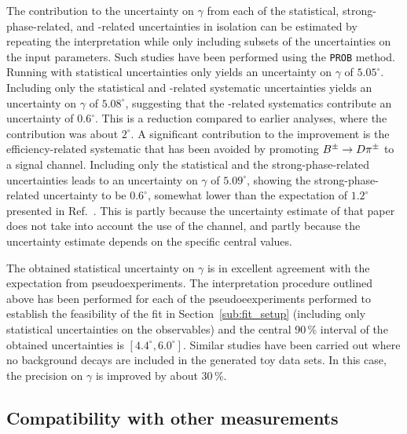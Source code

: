 The contribution to the uncertainty on $\gamma$ from each of the statistical, strong-phase-related, and \lhcb-related uncertainties in isolation can be estimated by repeating the interpretation while only including subsets of the uncertainties on the input parameters. Such studies have been performed using the \texttt{PROB} method. Running with statistical uncertainties only yields an uncertainty on $\gamma$ of $5.05^\circ$. Including only the statistical and \lhcb-related systematic uncertainties yields an uncertainty on $\gamma$ of $5.08^\circ$, suggesting that the \lhcb-related systematics  contribute an uncertainty of $0.6^\circ$. This is a reduction compared to earlier analyses, where the contribution was about $2^\circ$. A significant contribution to the improvement is the efficiency-related systematic that has been avoided by promoting ${{{B}^\pm}\rightarrow{\ensuremath{D}}{\ensuremath{{\pi}^\pm}}}$ to a signal channel. Including only the statistical and the strong-phase-related uncertainties leads to an uncertainty on $\gamma$ of $5.09^\circ$, showing the strong-phase-related uncertainty to be $0.6^\circ$, somewhat lower than the expectation of $1.2^\circ$  presented in Ref.~\cite{BESIII}. This is partly because the uncertainty estimate of that paper does not take into account the use of the \DtoKsKK channel, and partly because the uncertainty estimate depends on the specific central values.

The obtained statistical uncertainty on $\gamma$ is in excellent agreement with the expectation from pseudoexperiments. The interpretation procedure outlined above has been performed for each of the pseudoeexperiments performed to establish the feasibility of the \CP fit in Section~\ref{sub:fit_setup} (including only statistical uncertainties on the observables) and the central 90\,\% interval of the obtained uncertainties is $[4.4^\circ, 6.0^\circ]$. Similar studies have been carried out where no background decays are included in the generated toy data sets. In this case, the precision on $\gamma$ is improved by about 30\,\%.

\subsection{Compatibility with other measurements} %
\label{sub:compatibility_with_other_measurements}

